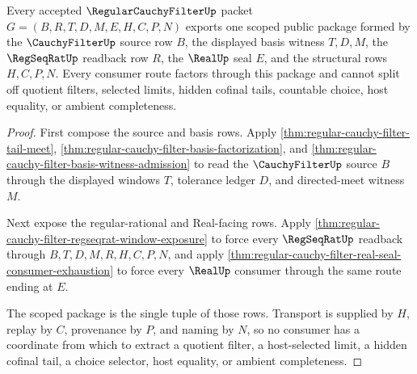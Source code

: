 \begin{theorem}
\label{thm:regular-cauchy-filter-scoped-public-package}
Every accepted $\RegularCauchyFilterUp$ packet $G=(B,R,T,D,M,E,H,C,P,N)$ exports one scoped public package formed by the $\CauchyFilterUp$ source row $B$, the displayed basis witness $T,D,M$, the $\RegSeqRatUp$ readback row $R$, the $\RealUp$ seal $E$, and the structural rows $H,C,P,N$. Every consumer route factors through this package and cannot split off quotient filters, selected limits, hidden cofinal tails, countable choice, host equality, or ambient completeness.
\end{theorem}
\begin{proof}
First compose the source and basis rows. Apply \autoref{thm:regular-cauchy-filter-tail-meet}, \autoref{thm:regular-cauchy-filter-basis-factorization}, and \autoref{thm:regular-cauchy-filter-basis-witness-admission} to read the $\CauchyFilterUp$ source $B$ through the displayed windows $T$, tolerance ledger $D$, and directed-meet witness $M$.

Next expose the regular-rational and Real-facing rows. Apply \autoref{thm:regular-cauchy-filter-regseqrat-window-exposure} to force every $\RegSeqRatUp$ readback through $B,T,D,M,R,H,C,P,N$, and apply \autoref{thm:regular-cauchy-filter-real-seal-consumer-exhaustion} to force every $\RealUp$ consumer through the same route ending at $E$.

The scoped package is the single tuple of those rows. Transport is supplied by $H$, replay by $C$, provenance by $P$, and naming by $N$, so no consumer has a coordinate from which to extract a quotient filter, a host-selected limit, a hidden cofinal tail, a choice selector, host equality, or ambient completeness.
\end{proof}

